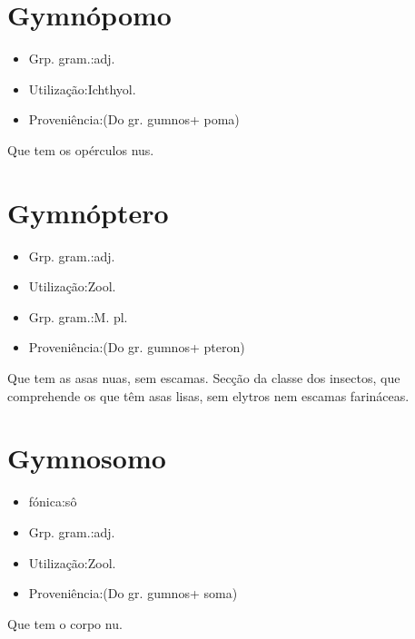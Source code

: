 \section{Gymnópomo}
\begin{itemize}
\item {Grp. gram.:adj.}
\end{itemize}
\begin{itemize}
\item {Utilização:Ichthyol.}
\end{itemize}
\begin{itemize}
\item {Proveniência:(Do gr. \textunderscore gumnos\textunderscore  + \textunderscore poma\textunderscore )}
\end{itemize}
Que tem os opérculos nus.
\section{Gymnóptero}
\begin{itemize}
\item {Grp. gram.:adj.}
\end{itemize}
\begin{itemize}
\item {Utilização:Zool.}
\end{itemize}
\begin{itemize}
\item {Grp. gram.:M. pl.}
\end{itemize}
\begin{itemize}
\item {Proveniência:(Do gr. \textunderscore gumnos\textunderscore  + \textunderscore pteron\textunderscore )}
\end{itemize}
Que tem as asas nuas, sem escamas.
Secção da classe dos insectos, que comprehende os que têm asas lisas, sem elytros nem escamas farináceas.
\section{Gymnosomo}
\begin{itemize}
\item {fónica:sô}
\end{itemize}
\begin{itemize}
\item {Grp. gram.:adj.}
\end{itemize}
\begin{itemize}
\item {Utilização:Zool.}
\end{itemize}
\begin{itemize}
\item {Proveniência:(Do gr. \textunderscore gumnos\textunderscore  + \textunderscore soma\textunderscore )}
\end{itemize}
Que tem o corpo nu.
